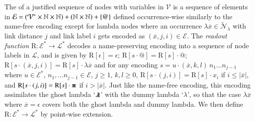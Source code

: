 \documentclass{elsarticle}
\theoremstyle{plain}
\theoremstyle{definition}
\newcommand\VarSet{\mathcal{V}}
\newcommand\Nodes{\mathcal{N}}%
\newcommand{\ghostlmd}{{\lambda\mkern-7mu \lambda}}
\newcommand{\ghostvar}{\mathsf{x\mkern-5mu x}}
\newcommand\ExtendedNodesLmd{\tilde{\Nodes}_{\lambda}}
\def\readout{\mathrm{R}} %
\def\nameencoding{\mathcal{E}} %
\begin{document}
The  of a justified sequence of nodes with variables in $\VarSet$ is a sequence of elements in
$\nameencoding = (\mathcal{V}^*\times\nat\times\nat) +
   (\nat\times\nat)
   + \{ @ \}$  defined occurrence-wise similarly to the name-free encoding
 except for lambda nodes where
  an occurrence $\lambda\overline{x}\in\ExtendedNodesLmd$
 with link distance $j$ and link label $i$ gets encoded
 as $(\overline{x},j,i) \in \mathcal{E}$.
%
The \emph{readout function} $\readout: \nameencoding^* \rightarrow \mathcal{L}^*$
decodes a name-preserving encoding into a sequence of node labels in $\mathcal{L}$, and is given by
$\readout[\epsilon]= \epsilon$;
$\readout[s \cdot @] = \readout[s] \cdot @$;
$\readout[s \cdot (\overline{x}, j, i) ] = \readout[s] \cdot \lambda\overline{x}$
and for any encoding $s = u \cdot (\overline{x}, k, l)\,  n_1 \ldots n_{j-1}$ where $u \in \nameencoding^*$, $n_1, \ldots n_{j-1}\in \nameencoding$, $j\geq 1$, $k,l\geq 0$,
$\readout[s\cdot (j,i)] = \readout[s] \cdot x_i$
if $i\leq |\overline{x}|$, and
$\readout[s\cdot (j,i)]  = \readout[s] \cdot \ghostvar$ if $i> |\overline{x}|$.
Just like the name-free encoding, this encoding assimilates the ghost lambda `$\ghostlmd$' with the dummy lambda `$\lambda$', so that the case $\lambda\overline{x}$ where $\overline{x}=\epsilon$ covers both the ghost lambda and dummy lambda.
%
We then define $\readout \colon \nameencoding^* \rightarrow \mathcal{L}^*$
by point-wise extension.
\end{document}
